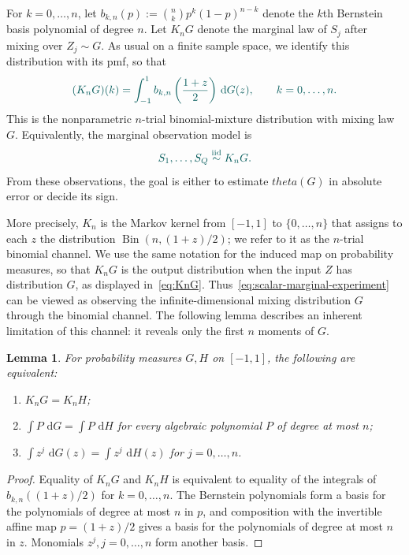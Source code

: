 \documentclass[11pt]{article}
\def\theta{theta}%
\newtheorem{lemma}[theorem]{Lemma}
\newcommand{\Bin}{\operatorname{Bin}}
\newcommand{\dd}{\,\mathrm d}
\newcommand\aed[1]{{\color{magenta!60!black} #1}}
\newcommand\ced[1]{{\color{teal!70!black} #1}}
\begin{document}
\ced{For $k=0,\dots,n$, let $b_{k,n}(p):=\binom nkp^k(1-p)^{n-k}$ denote the $k$th Bernstein basis polynomial of degree $n$.  Let $K_nG$ denote the marginal law of $S_j$ after mixing over $Z_j\sim G$.  As usual on a finite sample space, we identify this distribution with its pmf, so that}
\begin{equation}
\label{eq:KnG}
\ced{(K_nG)(k)
=
\int_{-1}^1
b_{k,n}\left(\frac{1+z}{2}\right)
\dd G(z),
\qquad k=0,\dots,n.}
\end{equation}
\ced{This is the nonparametric $n$-trial binomial-mixture distribution with mixing law $G$.  Equivalently, the marginal observation model is}
\begin{equation}
\label{eq:scalar-marginal-experiment}
\ced{S_1,\dots,S_Q\overset{\mathrm{iid}}{\sim}K_nG.}
\end{equation}
From these observations, the goal is either to estimate $\theta(G)$ in absolute error or \aed{decide its sign}. %

\ced{More precisely, $K_n$ is the Markov kernel from $[-1,1]$ to $\{0,\dots,n\}$ that assigns to each $z$ the distribution $\Bin(n,(1+z)/2)$; we refer to it as the $n$-trial binomial channel.  We use the same notation for the induced map on probability measures, so that $K_nG$ is the output distribution when the input $Z$ has distribution $G$, as displayed in~\eqref{eq:KnG}.  Thus~\eqref{eq:scalar-marginal-experiment} can be viewed as observing the infinite-dimensional mixing distribution $G$ through the binomial channel.  The following lemma describes an inherent limitation of this channel: it reveals only the first $n$ moments of $G$.}

\begin{lemma}%
\label{lem:moment-equivalence}
\ced{For probability measures $G,H$ on $[-1,1]$, the following are equivalent:}
\begin{enumerate}[label=(\alph*)]
\item \ced{$K_nG=K_nH$;}
\item \ced{$\int P\,\dd G=\int P\,\dd H$ for every algebraic polynomial $P$ of degree at most $n$;}
\item \ced{$\int z^j\,\dd G(z)=\int z^j\,\dd H(z)$ for $j=0,\dots,n$.}
\end{enumerate}
\end{lemma}

\begin{proof}
Equality of $K_nG$ and $K_nH$ is equivalent to equality of the integrals of $b_{k,n}((1+z)/2)$ for $k=0,\dots,n$.  The Bernstein polynomials form a basis for the polynomials of degree at most $n$ in $p$, and composition with the invertible affine map $p=(1+z)/2$ gives a basis for the polynomials of degree at most $n$ in $z$. \aed{Monomials $z^j, j=0,\dots,n$ form another basis.}
\end{proof}
\end{document}

